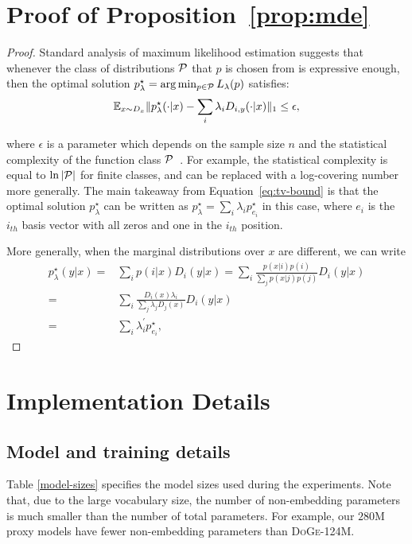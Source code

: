 \onecolumn
\section{Proof of Proposition~\ref{prop:mde}}
\label{sec:proof}
\begin{proof}
Standard analysis of maximum likelihood estimation suggests that whenever the class of distributions $\mathcal{P}$ that $p$ is chosen from is expressive enough, then the optimal solution $p^\star_\lambda = \arg\min_{p\in\mathcal{P}} L_\lambda(p)$ satisfies: 
\begin{equation}
    \mathbb{E}_{x\sim D_x} \|p^\star_\lambda(\cdot | x) - \sum_i \lambda_i D_{i,y}(\cdot | x)\|_1 \leq \epsilon,
    \label{eq:tv-bound}
\end{equation}

where $\epsilon$ is a parameter which depends on the sample size $n$ and the statistical complexity of the function class $\mathcal{P}$~\citep{geer2000empirical, zhang2006varepsilon}. For example, the statistical complexity is equal to $\ln|\mathcal{P}|$ for finite classes, and can be replaced with a log-covering number more generally. The main takeaway from Equation~\ref{eq:tv-bound} is that the optimal solution $p^\star_\lambda$ can be written as $p^\star_\lambda = \sum_i \lambda_i p^\star_{e_i}$ in this case, where $e_i$ is the $i_{th}$ basis vector with all zeros and one in the $i_{th}$ position.

More generally, when the marginal distributions over $x$ are different, we can write 
\begin{align*}
    p^\star_{\lambda}(y|x) =& \sum_i p(i | x) D_i(y|x) = \sum_i \frac{p(x|i)p(i)}{\sum_j p(x|j)p(j)} D_i(y|x)\\ 
    =& \sum_i \frac{D_i(x)\lambda_i}{\sum_j \lambda_j D_j (x)} D_i(y|x)\\ =& \sum_i \lambda_i^{'} p^\star_{e_i},
\end{align*}
%
\end{proof}




\section{Implementation Details}
\label{sec:appendix_implementation}






\subsection{Model and training details}
\label{sec:appendix_lms}
Table \ref{model-sizes} specifies the model sizes used during the experiments. Note that, due to the large vocabulary size, the number of non-embedding parameters is much smaller than the number of total parameters. For example, our $280$M proxy models have fewer non-embedding parameters than \textsc{DoGe-124M}.

